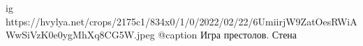  
 
 
 
 

\ifcmt
  ig https://hvylya.net/crops/2175c1/834x0/1/0/2022/02/22/6UmiirjW9ZatOesRWiAWwSiVzK0e0ygMhXq8CG5W.jpeg
  @caption Игра престолов. Стена
\fi
